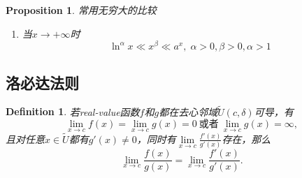 \documentclass{article}
\newtheorem{proposition}[theorem]{Proposition}
\newtheorem{definition}[theorem]{Definition}
\begin{document}
\begin{proposition}
\rm  {\color{red} 常用无穷大的比较}
\begin{enumerate}
	\item 当$x \rightarrow +\infty$时
	$$
		\ln^\alpha x \ll x^\beta \ll a^x, \;\alpha > 0 ,\beta > 0,\alpha > 1 
	$$
\end{enumerate}
\end{proposition}

\subsection{洛必达法则}

\begin{definition}
\rm 若real-value函数$f$和$g$都在去心邻域$\tilde{U}(c,\delta)$可导，有
$$
\lim\limits_{x \rightarrow c} f(x) = \lim\limits_{x \rightarrow c} g(x) = 0 ~\text{或者}~ \lim\limits_{x \rightarrow c} g(x) = \infty,
$$
且对任意$x \in \tilde{U}$都有$g'(x) \neq 0$，同时有$\lim\limits_{x \rightarrow c}\frac{f'(x)}{g'(x)}$存在，那么
$$
\lim\limits_{x \rightarrow c} \frac{f(x)}{g(x)} = \lim\limits_{x \rightarrow c} \frac{f'(x)}{g'(x)}.
$$
\end{definition}
\end{document}
